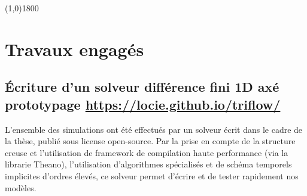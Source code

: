\documentclass[a0,portrait]{a0poster}
\begin{document}
\begin{center}
    \line(1,0){1800}
\end{center}

\section*{Travaux engagés}
\subsection*{Écriture d'un solveur différence fini 1D axé prototypage \url{https://locie.github.io/triflow/}}
    L'ensemble des simulations ont été effectués par un solveur écrit dans le cadre de la thèse, publié sous license open-source. Par la prise en compte de la structure creuse et l'utilisation de framework de compilation haute performance (via la librarie Theano), l'utilisation d'algorithmes spécialisés et de schéma temporels implicites d'ordres élevés, ce solveur permet d'écrire et de tester rapidement nos modèles.
\end{document}
